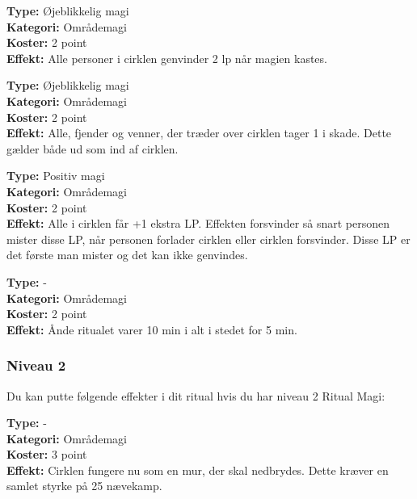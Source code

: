\begin{ritual*}[Helbredelse 1]
\textbf{Type:} Øjeblikkelig magi\\
\textbf{Kategori:} Områdemagi\\
\textbf{Koster:} 2 point\\
\textbf{Effekt:} Alle personer i cirklen genvinder 2 lp når magien kastes.
\end{ritual*}

\begin{ritual*}
\textbf{Type:} Øjeblikkelig magi\\
\textbf{Kategori:} Områdemagi\\
\textbf{Koster:} 2 point\\
\textbf{Effekt:} Alle, fjender og venner, der træder over cirklen tager 1 i skade. Dette gælder både ud som ind af cirklen.
\end{ritual*}

\begin{ritual*}
\textbf{Type:} Positiv magi\\
\textbf{Kategori:} Områdemagi\\
\textbf{Koster:} 2 point\\
\textbf{Effekt:} Alle i cirklen får +1 ekstra LP. Effekten forsvinder så snart personen mister disse LP, når personen forlader cirklen eller cirklen forsvinder. Disse LP er det første man mister og det kan ikke genvindes.
\end{ritual*}

\begin{ritual*}
\textbf{Type:} -\\
\textbf{Kategori:} Områdemagi\\
\textbf{Koster:} 2 point\\
\textbf{Effekt:} Ånde ritualet varer 10 min i alt i stedet for 5 min.
\end{ritual*}

\subsubsection*{Niveau 2}
Du kan putte følgende effekter i dit ritual hvis du har niveau 2 Ritual Magi:

\begin{ritual*}
\textbf{Type:} -\\
\textbf{Kategori:} Områdemagi\\
\textbf{Koster:} 3 point\\
\textbf{Effekt:} Cirklen fungere nu som en mur, der skal nedbrydes. Dette kræver en samlet styrke på 25 nævekamp.
\end{ritual*}

